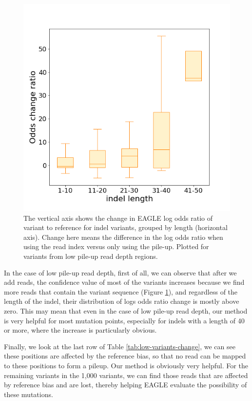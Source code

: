 \begin{figure}[H]
\centering
\includegraphics[width=0.6\columnwidth]{body/image/low_odds_change.png}
\caption[low pile-up read depth odds change ratio]
{The vertical axis shows the change in EAGLE log odds ratio of variant to reference for indel variants, grouped by length (horizontal axis).  Change here means the difference in the log odds ratio when using the read index versus only using the pile-up.  Plotted for variants from low pile-up read depth regions.}
\label{low_odds_change}
\end{figure}

In the case of low pile-up read depth, first of all, we can observe that after we add reads, the confidence value of most of the variants increases because we find more reads that contain the variant sequence (Figure \ref{low_odds_change}), and regardless of the length of the indel, their distribution of logs odds ratio change is mostly above zero.
This may mean that even in the case of low pile-up read depth, our method is very helpful for most mutation points, especially for indels with a length of 40 or more, where the increase is particularly obvious.

Finally, we look at the last row of Table \ref{tab:low-variants-change}, we can see these positions are affected by the reference bias, so that no read can be mapped to these positions to form a pileup. Our method is obviously very helpful. For the remaining variants in the 1,000 variants, we can find those reads that are affected by reference bias and are lost, thereby helping EAGLE evaluate the possibility of these mutations.

